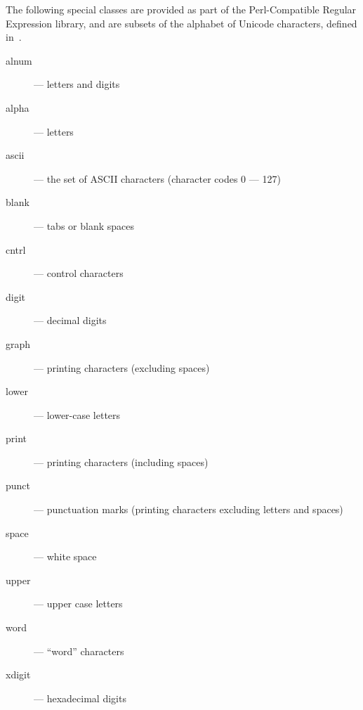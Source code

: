 The following special classes are provided as part of the Perl-Compatible
Regular Expression library, and are subsets of the alphabet of Unicode
characters, defined in~\cite{php_group_gutmans_lerdorf_suraski_boerger}.
\begin{multicols}{2}
\begin{description}

\item[alnum] --- letters and digits

\item[alpha] --- letters

\item[ascii] --- the set of ASCII characters (character codes 0 --- 127)

\item[blank] --- tabs or blank spaces

\item[cntrl] --- control characters

\item[digit] --- decimal digits

\item[graph] --- printing characters (excluding spaces)

\item[lower] --- lower-case letters

\item[print] --- printing characters (including spaces)

\item[punct] --- punctuation marks (printing characters excluding letters and spaces)

\item[space] --- white space

\item[upper] --- upper case letters

\item[word] --- ``word'' characters

\item[xdigit] --- hexadecimal digits

\end{description}
\end{multicols}
